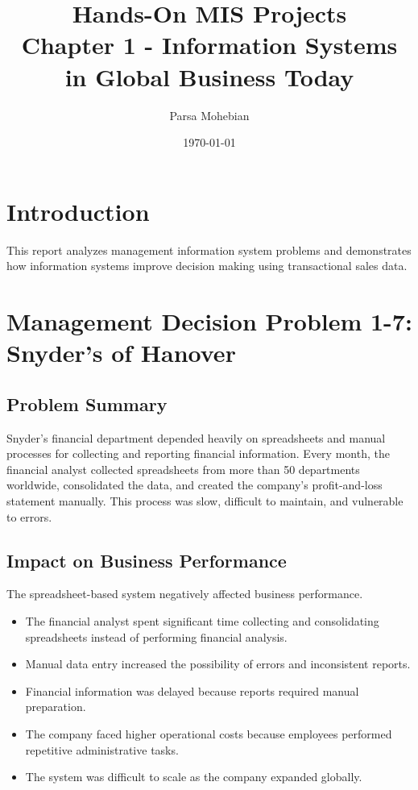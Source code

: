 \documentclass[12pt]{article}
\title{
Hands-On MIS Projects\\
Chapter 1 - Information Systems in Global Business Today
}
\author{
Parsa Mohebian
}
\date{\today}
\begin{document}
\maketitle

\tableofcontents

\newpage


\section{Introduction}

This report analyzes management information system problems and demonstrates
how information systems improve decision making using transactional sales data.


\section{Management Decision Problem 1-7: Snyder's of Hanover}

\subsection{Problem Summary}

Snyder's financial department depended heavily on spreadsheets and manual processes
for collecting and reporting financial information. Every month, the financial analyst
collected spreadsheets from more than 50 departments worldwide, consolidated the data,
and created the company's profit-and-loss statement manually. This process was slow,
difficult to maintain, and vulnerable to errors.

\subsection{Impact on Business Performance}

The spreadsheet-based system negatively affected business performance.

\begin{itemize}
    \item The financial analyst spent significant time collecting and consolidating
    spreadsheets instead of performing financial analysis.
    
    \item Manual data entry increased the possibility of errors and inconsistent reports.
    
    \item Financial information was delayed because reports required manual preparation.
    
    \item The company faced higher operational costs because employees performed
    repetitive administrative tasks.
    
    \item The system was difficult to scale as the company expanded globally.
\end{itemize}
\end{document}
